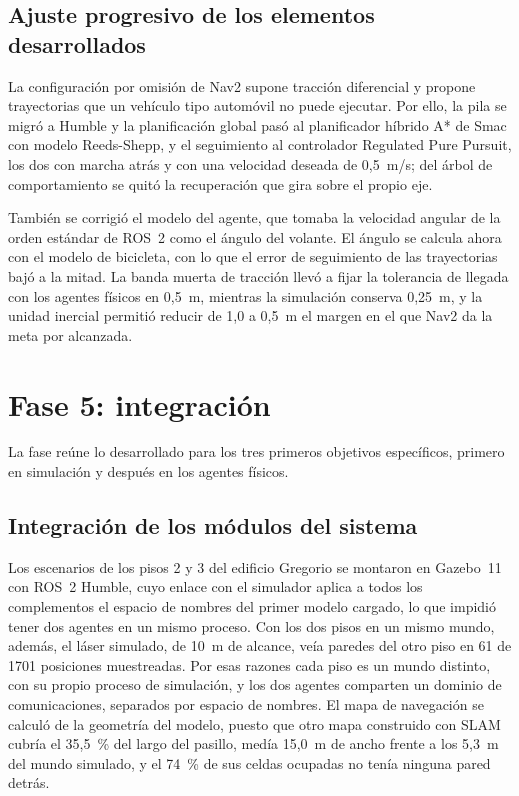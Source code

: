 \subsection{Ajuste progresivo de los elementos desarrollados}

La configuración por omisión de Nav2 supone tracción diferencial y propone trayectorias que un vehículo tipo automóvil no puede ejecutar. Por ello, la pila se migró a Humble y la planificación global pasó al planificador híbrido A* de Smac con modelo Reeds-Shepp, y el seguimiento al controlador Regulated Pure Pursuit, los dos con marcha atrás y con una velocidad deseada de 0,5~m/s; del árbol de comportamiento se quitó la recuperación que gira sobre el propio eje.

También se corrigió el modelo del agente, que tomaba la velocidad angular de la orden estándar de ROS~2 como el ángulo del volante. El ángulo se calcula ahora con el modelo de bicicleta, con lo que el error de seguimiento de las trayectorias bajó a la mitad. La banda muerta de tracción llevó a fijar la tolerancia de llegada con los agentes físicos en 0,5~m, mientras la simulación conserva 0,25~m, y la unidad inercial permitió reducir de 1,0 a 0,5~m el margen en el que Nav2 da la meta por alcanzada.

\section{Fase 5: integración}
\label{sec:integracion}

La fase reúne lo desarrollado para los tres primeros objetivos específicos, primero en simulación y después en los agentes físicos.

\subsection{Integración de los módulos del sistema}
\label{sec:simulacion}
\label{sec:sim-a-vehiculos}

Los escenarios de los pisos 2 y 3 del edificio Gregorio se montaron en Gazebo~11 con ROS~2 Humble, cuyo enlace con el simulador aplica a todos los complementos el espacio de nombres del primer modelo cargado, lo que impidió tener dos agentes en un mismo proceso. Con los dos pisos en un mismo mundo, además, el láser simulado, de 10~m de alcance, veía paredes del otro piso en 61 de 1701 posiciones muestreadas. Por esas razones cada piso es un mundo distinto, con su propio proceso de simulación, y los dos agentes comparten un dominio de comunicaciones, separados por espacio de nombres. El mapa de navegación se calculó de la geometría del modelo, puesto que otro mapa construido con SLAM cubría el 35,5~\% del largo del pasillo, medía 15,0~m de ancho frente a los 5,3~m del mundo simulado, y el 74~\% de sus celdas ocupadas no tenía ninguna pared detrás.

